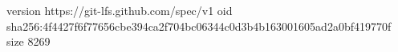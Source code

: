 version https://git-lfs.github.com/spec/v1
oid sha256:4f4427f6f77656cbe394ca2f704bc06344c0d3b4b163001605ad2a0bf419770f
size 8269
